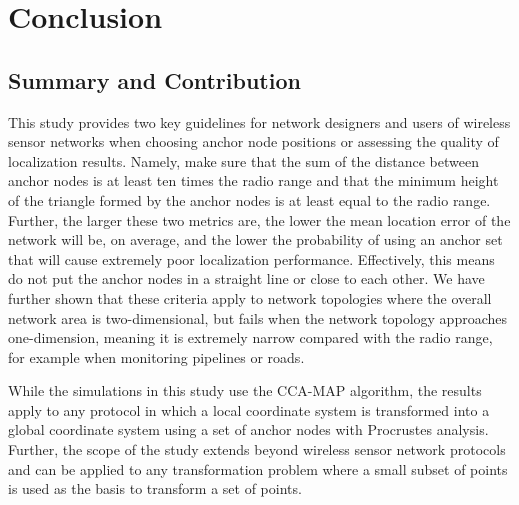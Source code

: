 \chapter{Conclusion}

\section{Summary and Contribution}
This study provides two key guidelines for network designers and users of wireless sensor networks when choosing anchor node positions or assessing the quality of localization results.  Namely, make sure that the sum of the distance between anchor nodes is at least ten times the radio range and that the minimum height of the triangle formed by the anchor nodes is at least equal to the radio range.  Further, the larger these two metrics are, the lower the mean location error of the network will be, on average, and the lower the probability of using an anchor set that will cause extremely poor localization performance.  Effectively, this means do not put the anchor nodes in a straight line or close to each other.  We have further shown that these criteria apply to network topologies where the overall network area is two-dimensional, but fails when the network topology approaches one-dimension, meaning it is extremely narrow compared with the radio range, for example when monitoring pipelines or roads.

While the simulations in this study use the CCA-MAP algorithm, the results apply to any protocol in which a local coordinate system is transformed into a global coordinate system using a set of anchor nodes with Procrustes analysis.  Further, the scope of the study extends beyond wireless sensor network protocols and can be applied to any transformation problem where a small subset of points is used as the basis to transform a set of points.

